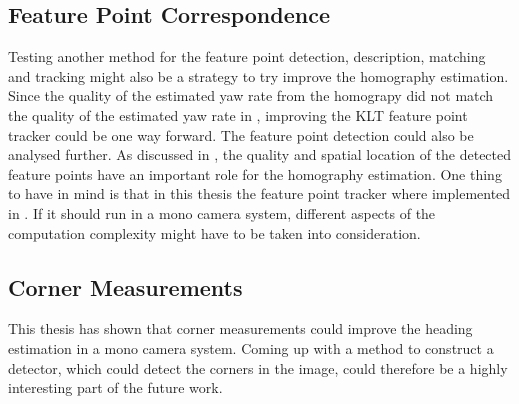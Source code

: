 \subsection{Feature Point Correspondence}
Testing another method for the feature point detection, description, matching and tracking might also be a strategy to try improve the homography estimation.
Since the quality of the estimated yaw rate from the homograpy did not match the quality of the estimated yaw rate in \cite{Gabb:2013}, improving the KLT feature point tracker could be one way forward.
The feature point detection could also be analysed further.
As discussed in , the quality and spatial location of the detected feature points have an important role for the homography estimation.
One thing to have in mind is that in this thesis the feature point tracker where implemented in \matlab.
If it should run in a mono camera system, different aspects of the computation complexity might have to be taken into consideration.

\subsection{Corner Measurements}
This thesis has shown that corner measurements could improve the heading estimation in a mono camera system.
Coming up with a method to construct a detector, which could detect the corners in the image, could therefore be a highly interesting part of the future work.